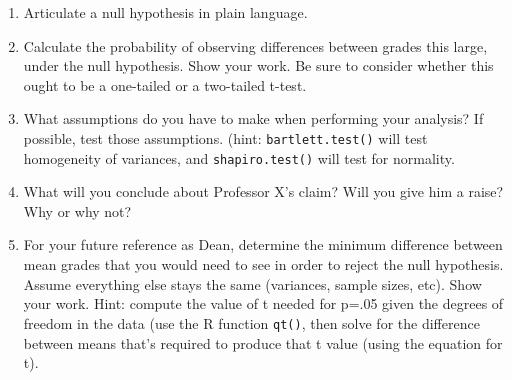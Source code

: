 \documentclass[10pt]{article}
\begin{document}
\begin{enumerate}

\item Articulate a null hypothesis in plain language.

\item Calculate the probability of observing differences between
  grades this large, under the null hypothesis. Show your work. Be
  sure to consider whether this ought to be a one-tailed or a
  two-tailed t-test.

\item What assumptions do you have to make when performing your
  analysis? If possible, test those assumptions. (hint:
  \texttt{bartlett.test()} will test homogeneity of variances, and
  \texttt{shapiro.test()} will test for normality.

\item What will you conclude about Professor X's claim? Will you give
  him a raise? Why or why not?

\item For your future reference as Dean, determine the minimum
  difference between mean grades that you would need to see in order
  to reject the null hypothesis. Assume everything else stays the same
  (variances, sample sizes, etc). Show your work. Hint: compute the
  value of t needed for p=.05 given the degrees of freedom in the data
  (use the R function \texttt{qt()}, then solve for the difference
  between means that's required to produce that t value (using the
  equation for t).


\end{enumerate}
\end{document}
